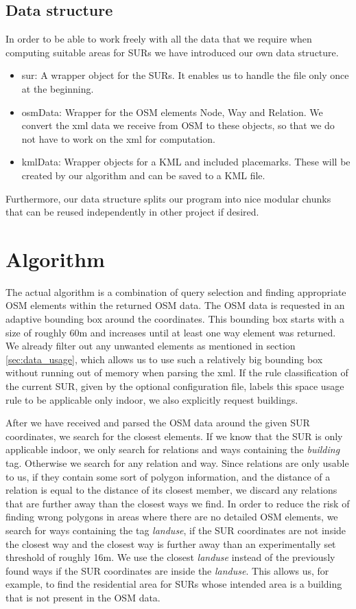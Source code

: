 \documentclass[11pt,fleqn]{book} %
\begin{document}
\subsection{Data structure}
In order to be able to work freely with all the data that we require when computing suitable areas for SURs we have introduced our own data structure.
\begin{itemize}
	\item sur: A wrapper object for the SURs. It enables us to handle the file only once at the beginning.
	\item osmData: Wrapper for the OSM elements Node, Way and Relation. We convert the xml data we receive from OSM to these objects, so that we do not have to work on the xml for computation.
	\item kmlData: Wrapper objects for a KML and included placemarks. These will be created by our algorithm and can be saved to a KML file.
\end{itemize}

Furthermore, our data structure splits our program into nice modular chunks that can be reused independently in other project if desired.

\section{Algorithm}\label{sec:algorithm}
The actual algorithm is a combination of query selection and finding appropriate OSM elements within the returned OSM data. The OSM data is requested in an adaptive bounding box around the coordinates. This bounding box starts with a size of roughly 60m and increases until at least one way element was returned. We already filter out any unwanted elements as mentioned in section \ref{sec:data_usage}, which allows us to use such a relatively big bounding box without running out of memory when parsing the xml. If the rule classification of the current SUR, given by the optional configuration file, labels this space usage rule to be applicable only indoor, we also explicitly request buildings.

After we have received and parsed the OSM data around the given SUR coordinates, we search for the closest elements. If we know that the SUR is only applicable indoor, we only search for relations and ways containing the \textit{building} tag. Otherwise we search for any relation and way. Since relations are only usable to us, if they contain some sort of polygon information, and the distance of a relation is equal to the distance of its closest member, we discard any relations that are further away than the closest ways we find. In order to reduce the risk of finding wrong polygons in areas where there are no detailed OSM elements, we search for ways containing the tag \textit{landuse}, if the SUR coordinates are not inside the closest way and the closest way is further away than an experimentally set threshold of roughly 16m. We use the closest \textit{landuse} instead of the previously found ways if the SUR coordinates are inside the \textit{landuse}. This allows us, for example, to find the residential area for SURs whose intended area is a building that is not present in the OSM data. 
\end{document}
